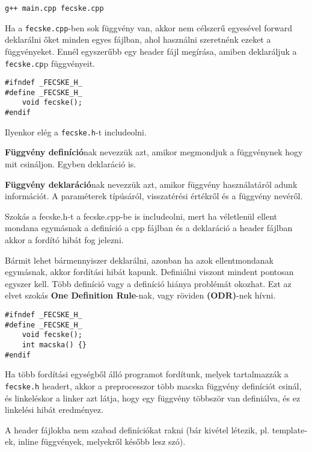 \documentclass[a4paper,11.5pt]{article}
\begin{document}
	{\centering\texttt{g++ main.cpp fecske.cpp} \par}
	
	Ha a \texttt{fecske.cpp}-ben sok függvény van, akkor nem célszerű egyesével forward deklarálni őket minden egyes fájlban, ahol használni szeretnénk ezeket a függvényeket. Ennél egyszerűbb egy header fájl megírása, amiben deklaráljuk a \texttt{fecske.cp}p függvényeit.
	\bigskip
	
	\begin{lstlisting}
#ifndef _FECSKE_H_
#define _FECSKE_H_
	void fecske();
#endif
	\end{lstlisting}
	Ilyenkor elég a \texttt{fecske.h}-t includeolni.
	\medskip
	
	\textbf{Függvény definíció}nak nevezzük azt, amikor megmondjuk a függvénynek hogy mit csináljon. Egyben deklaráció is.
	\medskip
	
	\textbf{Függvény deklaráció}nak nevezzük azt, amikor függvény használatáról adunk információt. A paraméterek típúsáról, visszatérési értékről és a függvény nevéről.
	\medskip
	
	Szokás a fecske.h-t a fecske.cpp-be is includeolni, mert ha véletlenül ellent mondana egymásnak a definíció a cpp fájlban és a deklaráció a header fájlban akkor a fordító hibát fog jelezni.
	
	Bármit lehet bármennyiszer deklarálni, azonban ha azok ellentmondanak egymásnak, akkor fordítási hibát kapunk. Definiálni viszont mindent pontosan egyszer kell. Több definíció vagy a definíció hiánya problémát okozhat. Ezt az elvet szokás \textbf{One Definition Rule}-nak, vagy röviden \textbf{(ODR)}-nek hívni.
	\bigskip
	
	\begin{lstlisting}
#ifndef _FECSKE_H_
#define _FECSKE_H_
	void fecske();
	int macska() {}
#endif
	\end{lstlisting}
		
	Ha több fordítási egységből álló programot fordítunk, melyek tartalmazzák a \texttt{fecske.h} headert, akkor a preprocesszor több macska függvény definíciót csinál, és linkeléskor a linker azt látja, hogy egy függvény többször van definiálva, és ez linkelési hibát eredményez.
	\begin{note}
		A header fájlokba nem szabad definíciókat rakni (bár kivétel létezik, pl. template-ek, inline függvények, melyekről később lesz szó).
	\end{note}
	
\end{document}
